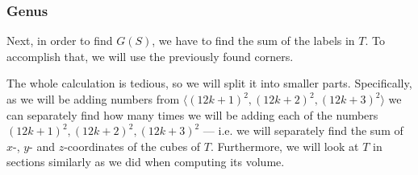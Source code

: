 \documentclass[12pt]{article}
\theoremstyle{remark}
\begin{document}
\subsubsection{Genus}

Next, in order to find $G(S)$, we have to find the sum of the labels in $T$. To accomplish that, we will use the previously found corners.

The whole calculation is tedious, so we will split it into smaller parts. Specifically, as we will be adding numbers from $\langle (12k+1)^2,(12k+2)^2,(12k+3)^2 \rangle$ we can separately find how many times we will be adding each of the numbers $(12k+1)^2,(12k+2)^2,(12k+3)^2$ --- i.e. we will separately find the sum of $x$-, $y$- and $z$-coordinates of the cubes of $T$. Furthermore, we will look at $T$ in sections similarly as we did when computing its volume. 
\end{document}
